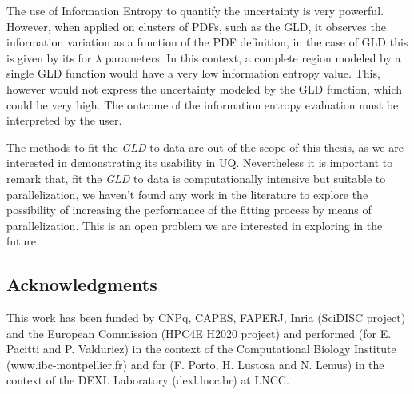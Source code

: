 The use of Information Entropy to quantify the uncertainty is very powerful. However, when applied on clusters of PDFs, such as the GLD, it observes the information variation as a function of the PDF definition, in the case of GLD this is given by its for $\lambda$ parameters. In this context, a complete region modeled by a single GLD function would have a very low information entropy value. This, however would not express the uncertainty modeled by the GLD function, which could be very high. The outcome of the information entropy evaluation must be interpreted by the user. 

The methods to fit the \textit{GLD} to data are out of the scope of this thesis, as we are interested in demonstrating its usability in UQ. Nevertheless it is important to remark that, fit the \textit{GLD} to data is computationally intensive but suitable to parallelization, we haven't found any work in the literature to explore the possibility of increasing the performance of the fitting process by means of parallelization. This is an open problem we are interested in exploring in the future.


\subsection*{Acknowledgments}
This work has been funded by CNPq, CAPES, FAPERJ, Inria (SciDISC project) and the European Commission (HPC4E H2020 project) and performed (for E. Pacitti and P. Valduriez) in the context of the Computational Biology Institute (www.ibc-montpellier.fr) and for (F. Porto, H. Lustosa and N. Lemus) in the context of the DEXL Laboratory (dexl.lncc.br)  at LNCC.
